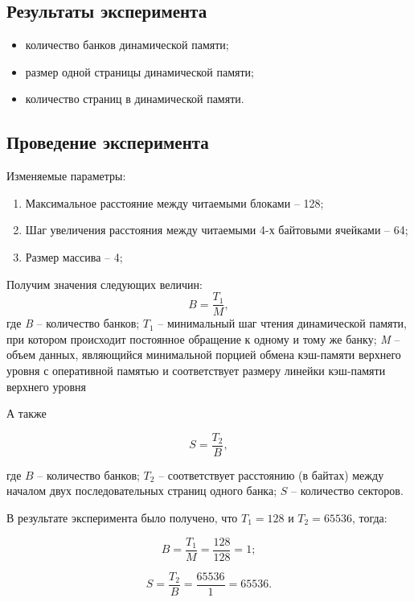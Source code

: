 \subsection*{Результаты эксперимента}

\begin{itemize}[label*=--]
	\item количество банков динамической памяти;
	\item размер одной страницы динамической памяти;
	\item количество страниц в динамической памяти.
\end{itemize}

\subsection*{Проведение эксперимента}

Изменяемые параметры:

\begin{enumerate}[label*=--]
	\item Максимальное расстояние между читаемыми блоками -- 128;
	\item Шаг увеличения расстояния между читаемыми 4-х байтовыми ячейками -- 64;
	\item Размер массива -- 4;
\end{enumerate}


Получим значения следующих величин:
\begin{equation}
	B = \frac{T_1}{M},
\end{equation}
где \textit{B} -- количество банков; $T_1$ -- минимальный шаг чтения
динамической памяти, при котором происходит постоянное обращение к одному и
тому же банку; \textit{M} -- объем данных, являющийся минимальной порцией
обмена кэш-памяти верхнего уровня с оперативной памятью и соответствует размеру линейки кэш-памяти верхнего уровня

А также

\begin{equation}
	S = \frac{T_2}{B},
\end{equation}

где $B$ -- количество банков; $T_2$ -- соответствует расстоянию (в байтах) между началом двух последовательных страниц одного банка; $S$ -- количество секторов.

В результате эксперимента было получено, что $T_1 = 128$ и $T_2 = 65536$, тогда:

\begin{equation}
	B = \frac{T_1}{M} = \frac{128}{128} = 1;
\end{equation}

\begin{equation}
	S = \frac{T_2}{B} = \frac{65536}{1} = 65536.
\end{equation}


